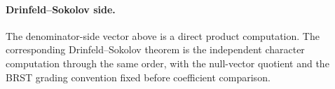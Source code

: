\paragraph{Drinfeld--Sokolov side.}
The denominator-side vector above is a direct product computation.  The
corresponding Drinfeld--Sokolov theorem is the independent character
computation through the same order, with the null-vector quotient and
the BRST grading convention fixed before coefficient comparison.

